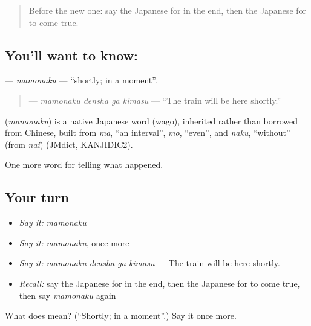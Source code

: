 \label{lesson:JA-C310-mamonaku}



\begin{quote}
Before the new one: say the Japanese for in the end, then the Japanese for to come true.
\end{quote}

\subsection*{You'll want to know: }
\textbf{} — \emph{mamonaku} — \textquotedblleft{}shortly; in a moment\textquotedblright{}.

\begin{quote}
\textbf{  } — \emph{mamonaku densha ga kimasu} — \textquotedblleft{}The train will be here shortly.\textquotedblright{}
\end{quote}

\begin{cousinweb}
\textbf{} (\emph{mamonaku}) is a native Japanese word (wago), inherited rather than borrowed from Chinese, built from \emph{ma}, \textquotedblleft{}an interval\textquotedblright{}, \emph{mo}, \textquotedblleft{}even\textquotedblright{}, and \emph{naku}, \textquotedblleft{}without\textquotedblright{} (from \emph{nai}) (JMdict, KANJIDIC2).
\end{cousinweb}

\begin{grammarlens}[title={What you've built}]
One more word for telling what happened.
\end{grammarlens}

\subsection*{Your turn}
\begin{itemize}
\raggedright
  \item \emph{Say it:} \emph{mamonaku}
  \item \emph{Say it:} \emph{mamonaku}, once more
  \item \emph{Say it:} \emph{mamonaku densha ga kimasu} — The train will be here shortly.
  \item \emph{Recall:} say the Japanese for in the end, then the Japanese for to come true, then say \emph{mamonaku} again
\end{itemize}

\begin{tcolorbox}[breakable,colback=teal!4,colframe=teal!35!black,title={Before you move on}]
What does  mean? (\textquotedblleft{}Shortly; in a moment\textquotedblright{}.) Say it once more.
\end{tcolorbox}
